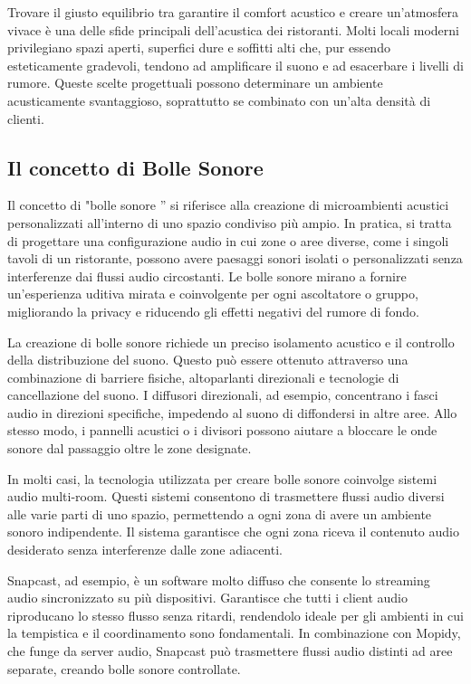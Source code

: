 Trovare il giusto equilibrio tra garantire il comfort acustico e creare un'atmosfera vivace è una delle sfide principali dell'acustica dei ristoranti. Molti locali moderni privilegiano spazi aperti, superfici dure e soffitti alti che, pur essendo esteticamente gradevoli, tendono ad amplificare il suono e ad esacerbare i livelli di rumore. Queste scelte progettuali possono determinare un ambiente acusticamente svantaggioso, soprattutto se combinato con un'alta densità di clienti. \cite{wiki:sound-restaurants}

\subsection{Il concetto di Bolle Sonore}
\noindent

Il concetto di "bolle sonore ” si riferisce alla creazione di microambienti acustici personalizzati all'interno di uno spazio condiviso più ampio. In pratica, si tratta di progettare una configurazione audio in cui zone o aree diverse, come i singoli tavoli di un ristorante, possono avere paesaggi sonori isolati o personalizzati senza interferenze dai flussi audio circostanti. Le bolle sonore mirano a fornire un'esperienza uditiva mirata e coinvolgente per ogni ascoltatore o gruppo, migliorando la privacy e riducendo gli effetti negativi del rumore di fondo.

La creazione di bolle sonore richiede un preciso isolamento acustico e il controllo della distribuzione del suono. Questo può essere ottenuto attraverso una combinazione di barriere fisiche, altoparlanti direzionali e tecnologie di cancellazione del suono. I diffusori direzionali, ad esempio, concentrano i fasci audio in direzioni specifiche, impedendo al suono di diffondersi in altre aree. Allo stesso modo, i pannelli acustici o i divisori possono aiutare a bloccare le onde sonore dal passaggio oltre le zone designate.

In molti casi, la tecnologia utilizzata per creare bolle sonore coinvolge sistemi audio multi-room. Questi sistemi consentono di trasmettere flussi audio diversi alle varie parti di uno spazio, permettendo a ogni zona di avere un ambiente sonoro indipendente. Il sistema garantisce che ogni zona riceva il contenuto audio desiderato senza interferenze dalle zone adiacenti.

Snapcast, ad esempio, è un software molto diffuso che consente lo streaming audio sincronizzato su più dispositivi. Garantisce che tutti i client audio riproducano lo stesso flusso senza ritardi, rendendolo ideale per gli ambienti in cui la tempistica e il coordinamento sono fondamentali. In combinazione con Mopidy, che funge da server audio, Snapcast può trasmettere flussi audio distinti ad aree separate, creando bolle sonore controllate.

